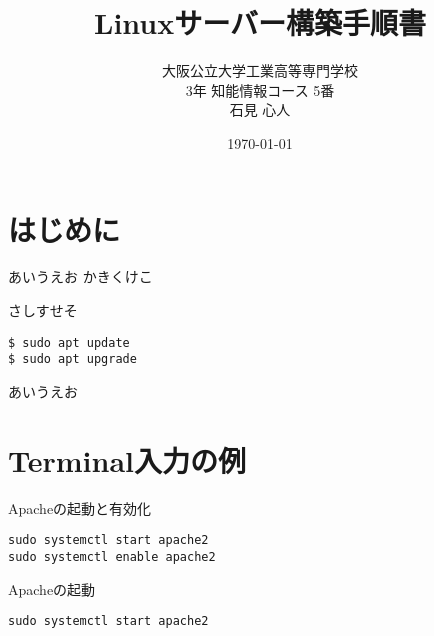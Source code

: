 \documentclass[a4paper, 11pt, dvipdfmx]{jsarticle}
\begin{document}
\title{Linuxサーバー構築手順書}
\author{大阪公立大学工業高等専門学校\\
3年 知能情報コース 5番\\
石見 心人}
\date{\today}
\maketitle\thispagestyle{empty}

\newpage
\setcounter{section}{0}

\section{はじめに}
あいうえお
かきくけこ

さしすせそ
  \begin{commandbox}{}
    \verb|$ sudo apt update|\\
    \verb|$ sudo apt upgrade|
  \end{commandbox}

  \begin{tcolorbox}[additionalstyle]
    あいうえお
  \end{tcolorbox}

\section{Terminal入力の例}
  \begin{commandbox}{Apacheの起動と有効化}
\begin{lstlisting}
sudo systemctl start apache2
sudo systemctl enable apache2
\end{lstlisting}
  \end{commandbox}

  \begin{commandbox}{Apacheの起動}
\begin{lstlisting}
sudo systemctl start apache2
\end{lstlisting}
  \end{commandbox}
\end{document}
